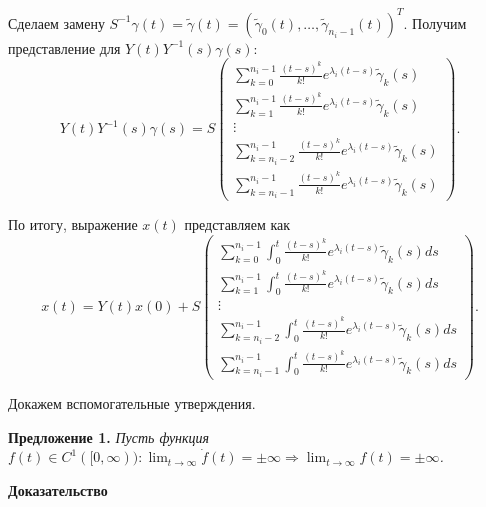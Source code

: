 \documentclass[12pt, a4paper]{article}
\begin{document}
\newpage

\quad Сделаем замену $S^{-1}\gamma(t) = \widetilde{\gamma}(t) = (\widetilde{\gamma}_0(t), \dots, \widetilde{\gamma}_{n_i - 1}(t))^T$. Получим представление для  $Y(t)Y^{-1}(s)\gamma(s)$:
\[
Y(t)Y^{-1}(s)\gamma(s) = S \left(
\begin{array}{c}
\displaystyle \sum_{k=0}^{n_i - 1}\frac{(t-s)^k}{k!}e^{\lambda_{i}(t-s)}\widetilde{\gamma}_k(s) \\
\displaystyle \sum_{k=1}^{n_i - 1}\frac{(t-s)^k}{k!}e^{\lambda_{i}(t-s)}\widetilde{\gamma}_k(s) \\
\vdots \\
\displaystyle \sum_{k=n_i-2}^{n_i - 1}\frac{(t-s)^k}{k!}e^{\lambda_{i}(t-s)}\widetilde{\gamma}_k(s) \\
\displaystyle \sum_{k=n_i-1}^{n_i - 1}\frac{(t-s)^k}{k!}e^{\lambda_{i}(t-s)}\widetilde{\gamma}_k(s)
\end{array}
\right).
\]

\quad По итогу, выражение $x(t)$ представляем как
\[
x(t) = Y(t)x(0) + S
\left(
\begin{array}{c}
\displaystyle \sum_{k=0}^{n_i - 1}\int_0^t\frac{(t-s)^k}{k!}e^{\lambda_{i}(t-s)}\widetilde{\gamma}_k(s)ds \\
\displaystyle \sum_{k=1}^{n_i - 1}\int_0^t\frac{(t-s)^k}{k!}e^{\lambda_{i}(t-s)}\widetilde{\gamma}_k(s)ds \\
\vdots \\
\displaystyle \sum_{k=n_i-2}^{n_i - 1}\int_0^t\frac{(t-s)^k}{k!}e^{\lambda_{i}(t-s)}\widetilde{\gamma}_k(s)ds \\
\displaystyle \sum_{k=n_i-1}^{n_i - 1}\int_0^t\frac{(t-s)^k}{k!}e^{\lambda_{i}(t-s)}\widetilde{\gamma}_k(s)ds
\end{array}
\right)
.
\]

Докажем вспомогательные утверждения.

\quad \textbf{Предложение 1.} \textit{Пусть функция $f(t) \in C^1([0, \infty)) : \displaystyle\lim_{t \rightarrow \infty}\dot{f}(t) = \pm \infty \Rightarrow \lim_{t \rightarrow \infty}f(t) = \pm \infty$.}

\begin{center}
\textbf{Доказательство}
\end{center}
\end{document}
